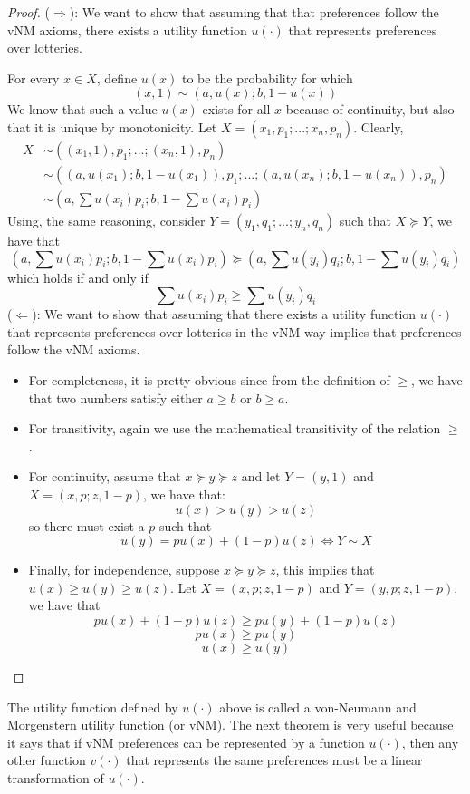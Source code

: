 \documentclass[12pt]{report}
\begin{document}
\begin{proof}
($\Rightarrow$): We want to show that assuming that that preferences follow the vNM axioms, there exists a utility function $u(\cdot)$ that represents preferences over lotteries.

For every $x\in X$, define $u(x)$ to be the probability for which $$ (x,1)\sim (a, u(x); b, 1-u(x)) $$ We know that such a value $u(x)$ exists for all $x$ because of continuity, but also that it is unique by monotonicity. Let $X = (x_1,p_1;...;x_n,p_n)$. Clearly,\begin{align*}
X&\sim ((x_1,1),p_1;...;(x_n,1),p_n)\\
&\sim ((a, u(x_1); b, 1-u(x_1)),p_1;...;(a, u(x_n); b, 1-u(x_n)),p_n)\\
&\sim (a,\sum u(x_i)p_i; b,1 - \sum u(x_i)p_i)
\end{align*} Using, the same reasoning, consider $Y = (y_1,q_1;...;y_n,q_n)$ such that $X\succeq Y$, we have that $$(a,\sum u(x_i)p_i; b,1 - \sum u(x_i)p_i)\succeq (a,\sum u(y_i)q_i; b,1 - \sum u(y_i)q_i)$$ which holds if and only if $$\sum u(x_i)p_i\geq\sum u(y_i)q_i$$
($\Leftarrow$): We want to show that assuming that there exists a utility function $u(\cdot)$ that represents preferences over lotteries in the vNM way implies that preferences follow the vNM axioms.\begin{itemize}
\item For completeness, it is pretty obvious since from the definition of $\geq$, we have that two numbers satisfy either $a\geq b$ or $b\geq a$.
\item For transitivity, again we use the mathematical transitivity of the relation $\geq$.
\item For continuity, assume that $x\succeq y\succeq z$ and let $Y = (y, 1)$ and $X = (x, p ; z, 1 - p)$, we have that: $$ u(x) > u(y) > u(z) $$ so there must exist a $p$ such that $$u(y) = pu(x) + (1-p)u(z) \Leftrightarrow Y\sim X$$
\item Finally, for independence, suppose $x\succeq y\succeq z$, this implies that $u(x)\geq u(y)\geq u(z)$. Let $X = (x, p; z, 1-p)$ and $Y = (y, p; z, 1-p)$, we have that $$pu(x) + (1-p)u(z) \geq pu(y) + (1-p)u(z)$$ $$ pu(x) \geq pu(y) $$ $$ u(x)\geq u(y)$$
\end{itemize}
\end{proof}

The utility function defined by $u(\cdot)$ above is called a von-Neumann and Morgenstern utility function (or vNM). The next theorem is very useful because it says that if vNM preferences can be represented by a function $u(\cdot)$, then any other function $v(\cdot)$ that represents the same preferences must be a linear transformation of $u(\cdot)$.
\end{document}
